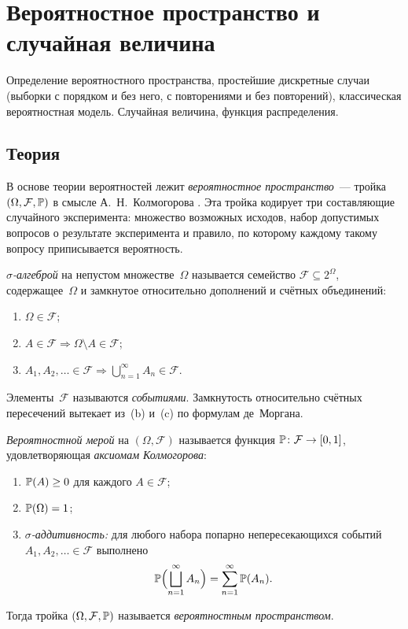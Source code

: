 
\section{Вероятностное пространство и случайная величина}
\label{sec:1.2.01-prob-space-rv}

\begin{ticket}
Определение вероятностного пространства, простейшие дискретные случаи (выборки с порядком и без него, с повторениями и без повторений), классическая вероятностная модель. Случайная величина, функция распределения.
\end{ticket}

\subsection*{Теория}

В основе теории вероятностей лежит \emph{вероятностное пространство}~--- тройка $(\Omega, \mathcal{F}, \mathbb{P})$ в смысле А.~Н.~Колмогорова \cite{Shiryaev1989}. Эта тройка кодирует три составляющие случайного эксперимента: множество возможных исходов, набор допустимых вопросов о результате эксперимента и правило, по которому каждому такому вопросу приписывается вероятность.

\begin{definition}
\label{def:sigma-algebra}
\emph{$\sigma$-алгеброй} на непустом множестве~$\Omega$ называется семейство $\mathcal{F} \subseteq 2^{\Omega}$, содержащее~$\Omega$ и замкнутое относительно дополнений и счётных объединений:
\begin{enumerate}[label=(\alph*)]
  \item $\Omega \in \mathcal{F}$;
  \item $A \in \mathcal{F} \Rightarrow \Omega \setminus A \in \mathcal{F}$;
  \item $A_1, A_2, \dots \in \mathcal{F} \Rightarrow \bigcup_{n=1}^{\infty} A_n \in \mathcal{F}$.
\end{enumerate}
Элементы~$\mathcal{F}$ называются \emph{событиями}. Замкнутость относительно счётных пересечений вытекает из~(b) и~(c) по формулам де~Моргана.
\end{definition}

\begin{definition}
\label{def:prob-measure}
\emph{Вероятностной мерой} на $(\Omega, \mathcal{F})$ называется функция $\mathbb{P} \colon \mathcal{F} \to [0, 1]$, удовлетворяющая \emph{аксиомам Колмогорова}:
\begin{enumerate}[label=(P\arabic*)]
  \item $\mathbb{P}(A) \geq 0$ для каждого $A \in \mathcal{F}$;
  \item $\mathbb{P}(\Omega) = 1$;
  \item \emph{$\sigma$-аддитивность:} для любого набора попарно непересекающихся событий $A_1, A_2, \dots \in \mathcal{F}$ выполнено
        \[
          \mathbb{P}\Bigl(\bigsqcup_{n=1}^{\infty} A_n\Bigr) = \sum_{n=1}^{\infty} \mathbb{P}(A_n).
        \]
\end{enumerate}
Тогда тройка $(\Omega, \mathcal{F}, \mathbb{P})$ называется \emph{вероятностным пространством}.
\end{definition}

